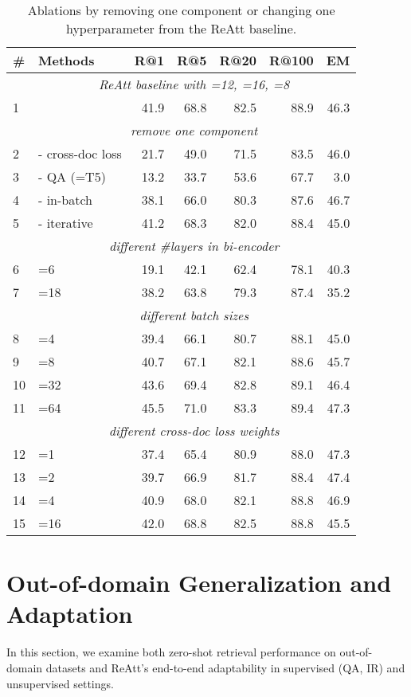 \documentclass[11pt, dvipsnames]{article}
\def\smallcol{\hskip 4pt}
\newcommand{\ours}{ReAtt\xspace}
\begin{document}
\begin{table}[tb]
\centering
\small
\begin{tabular}{ll@{\smallcol}r@{\smallcol}r@{\smallcol}r@{\smallcol}r|@{\smallcol}r}
\toprule
\textbf{\#} & \textbf{Methods} & \textbf{R@1} & \textbf{R@5} & \textbf{R@20} & \textbf{R@100} & \textbf{EM} \\
\midrule 
& \multicolumn{6}{c}{\emph{\ours baseline with =12, =16, =8}} \\
1 & & 41.9 & 68.8 & 82.5 & 88.9 & 46.3 \\
\midrule
& \multicolumn{6}{c}{\emph{remove one component}} \\
2 & - cross-doc loss & 21.7 & 49.0 & 71.5 & 83.5 & 46.0 \\
3 & \quad - QA (=T5) & 13.2 & 33.7 & 53.6 & 67.7 & 3.0 \\
4 & - in-batch & 38.1 & 66.0 & 80.3 & 87.6 & 46.7 \\
5 & - iterative & 41.2 & 68.3 & 82.0 & 88.4 & 45.0 \\
\midrule
& \multicolumn{6}{c}{\emph{different \#layers in bi-encoder }} \\
6 & =6 & 19.1 & 42.1 & 62.4 & 78.1 & 40.3 \\
7 & =18 & 38.2 & 63.8 & 79.3 & 87.4 & 35.2 \\
\midrule
& \multicolumn{6}{c}{\emph{different batch sizes }} \\
8 & =4 & 39.4 & 66.1 & 80.7 & 88.1 & 45.0 \\
9 & =8 & 40.7 & 67.1 & 82.1 & 88.6 & 45.7 \\
10 & =32 & 43.6 & 69.4 & 82.8 & 89.1 & 46.4 \\
11 & =64 & 45.5 & 71.0 & 83.3 & 89.4 & 47.3 \\
\midrule
& \multicolumn{6}{c}{\emph{different cross-doc loss weights }} \\
12 & =1 & 37.4 & 65.4 & 80.9 & 88.0 & 47.3 \\
13 & =2 & 39.7 & 66.9 & 81.7 & 88.4 & 47.4 \\
14 & =4 & 40.9 & 68.0 & 82.1 & 88.8 & 46.9 \\
15 & =16 & 42.0 & 68.8 & 82.5 & 88.8 & 45.5 \\
\bottomrule
\end{tabular}
\caption{Ablations by removing one component or changing one hyperparameter from the \ours baseline.}
\label{tab:abl}
\end{table}

\section{Out-of-domain Generalization and Adaptation}
In this section, we examine both zero-shot retrieval performance on out-of-domain datasets and \ours's end-to-end adaptability in supervised (QA, IR) and unsupervised settings.
\end{document}
